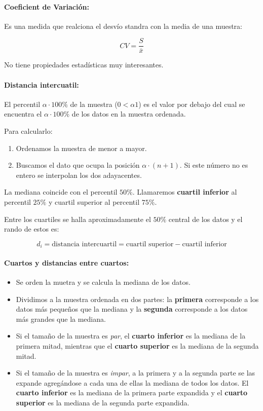 \paragraph{Coeficient de Variación:} Es una medida que realciona el desvío standra con la media de una muestra:

$$CV = \frac{S}{\bar{x}}$$

No tiene propiedades estadísticas muy interesantes.

\paragraph{Distancia intercuatil:} El percentil $\alpha\cdot100\%$ de la muestra ($0 < \alpha 1$) es el valor por debajo del cual se encuentra el $\alpha\cdot100\%$ de los datos en la muestra ordenada.

Para calcularlo:
\begin{enumerate}
	\item Ordenamos la muestra de menor a mayor.
	\item Buscamos el dato que ocupa la posición $\alpha\cdot(n+1)$. Si este número no es entero se interpolan los dos adayacentes.
\end{enumerate}

La mediana coincide con el percentil $50\%$. Llamaremos \textbf{cuartil inferior} al percentil $25\%$ y cuartil superior al percentil $75\%$.

Entre los cuartiles se halla aproximadamente el $50\%$ central de los datos y el rando de estos es:

$$d_i = \text{distancia intercuartil} = \text{cuartil superior} - \text{cuartil inferior}$$

\paragraph{Cuartos y distancias entre cuartos:}
\begin{itemize}
	\item Se orden la muetra y se calcula la mediana de los datos.
	\item Dividimos a la muestra ordenada en dos partes: la \textbf{primera} corresponde a los datos más pequeños que la mediana y la \textbf{segunda} corresponde a los datos más grandes que la mediana.
	\item Si el tamaño de la muestra es \textit{par}, el \textbf{cuarto inferior} es la mediana de la primera mitad, mientras que el \textbf{cuarto superior} es la mediana de la segunda mitad.
	\item Si el tamaño de la muestra es \textit{impar}, a la primera y a la segunda parte se las expande agregándose a cada una de ellas la mediana de todos los datos. El \textbf{cuarto inferior} es la mediana de la primera parte expandida y el \textbf{cuarto superior} es la mediana de la segunda parte expandida.
\end{itemize}


